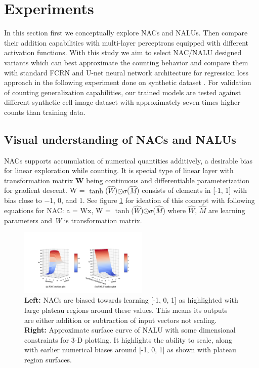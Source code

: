\documentclass[conference]{IEEEtran}
\begin{document}
\section{Experiments}

In this section first we conceptually explore NACs and NALUs. Then compare their addition capabilities with multi-layer perceptrons equipped with different activation functions. With this study we aim to select NAC/NALU designed variants which can best approximate the counting behavior and compare them with standard FCRN and U-net neural network architecture for regression loss approach in the following experiment done on synthetic dataset \cite{b29}. For validation of counting generalization capabilities, our trained models are tested against different synthetic cell image dataset with approximately seven times higher counts than training data.

\subsection{Visual understanding of NACs and NALUs}


NACs \cite{b7} supports accumulation of numerical quantities additively, a desirable bias for linear exploration while counting. It is special type of linear layer with transformation matrix \textbf{W} being continuous and differentiable parameterization for gradient descent. W = $\tanh$($\hat{W}$)$\odot$$\sigma$($\hat{M}$)  consists of elements in [-1, 1] with bias close to  −1, 0, and 1. See figure \ref{fig3} for ideation of this concept with following equations for NAC:  a = Wx, W = $\tanh$($\hat{W}$)$\odot$$\sigma$($\hat{M}$) where \textit{$\hat{W}$}, \textit{$\hat{M}$} are learning parameters and \textit{W} is transformation matrix.

\begin{figure}[!h]
\centering
\includegraphics[width=0.55\textwidth]{nac-nalu-comparison.png}
\caption{
\textbf{Left:} NACs are biased towards learning [-1, 0, 1] as highlighted with large plateau regions around these values. This means its outputs are either addition or subtraction of input vectors not scaling.
\textbf{Right:} Approximate surface curve of NALU with some dimensional constraints for 3-D plotting. It highlights the ability to scale, along with earlier numerical biases around [-1, 0, 1] as shown with plateau region surfaces.}
\label{fig3}
\end{figure}
\end{document}
